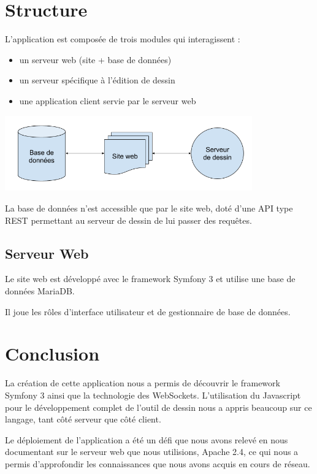 \documentclass[a4paper]{article}
\begin{document}
\section{Structure}
L'application est composée de trois modules qui interagissent :
\begin{itemize}
	\item un serveur web (site + base de données)
	\item un serveur spécifique à l'édition de dessin
	\item une application client servie par le serveur web
\end{itemize}

\begin{center}
	\includegraphics[width=0.8\textwidth]{sketcher_global_structure.png}
\end{center}

La base de données n'est accessible que par le site web, doté d'une API type REST permettant au serveur de dessin de lui passer des requêtes.

\subsection{Serveur Web}
Le site web est développé avec le framework Symfony 3 et utilise une base de données MariaDB.

Il joue les rôles d'interface utilisateur et de gestionnaire de base de données.

\section{Conclusion}
La création de cette application nous a permis de découvrir le framework Symfony 3 ainsi que la technologie des WebSockets. L'utilisation du Javascript pour le développement complet de l'outil de dessin nous a appris beaucoup sur ce langage, tant côté serveur que côté client.

Le déploiement de l'application a été un défi que nous avons relevé en nous documentant sur le serveur web que nous utilisions, Apache 2.4, ce qui nous a permis d'approfondir les connaissances que nous avons acquis en cours de réseau.
\newpage


\end{document}
